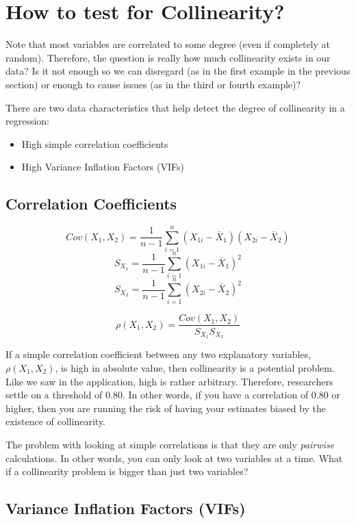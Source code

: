 \documentclass[
]{book}
\begin{document}
\hypertarget{how-to-test-for-collinearity}{%
\section{How to test for Collinearity?}\label{how-to-test-for-collinearity}}

Note that most variables are correlated to some degree (even if completely at random). Therefore, the question is really how much collinearity exists in our data? Is it not enough so we can disregard (as in the first example in the previous section) or enough to cause issues (as in the third or fourth example)?

There are two data characteristics that help detect the degree of collinearity in a regression:

\begin{itemize}
\item
  High simple correlation coefficients
\item
  High Variance Inflation Factors (VIFs)
\end{itemize}

\hypertarget{correlation-coefficients}{%
\subsection*{Correlation Coefficients}\label{correlation-coefficients}}

\[Cov(X_1,X_2)=\frac{1}{n-1} \sum_{i=1}^n (X_{1i}-\bar{X}_1)(X_{2i}-\bar{X}_2)\]
\[S_{X_1} = \frac{1}{n-1} \sum_{i=1}^n (X_{1i}-\bar{X}_1)^2\]
\[S_{X_2} = \frac{1}{n-1} \sum_{i=1}^n (X_{2i}-\bar{X}_2)^2\]

\[\rho(X_1,X_2) = \frac{Cov(X_1,X_2)}{S_{X_1}S_{X_2}}\]

If a simple correlation coefficient between any two explanatory variables, \(\rho(X_1,X_2)\), is high in absolute value, then collinearity is a potential problem. Like we saw in the application, high is rather arbitrary. Therefore, researchers settle on a threshold of 0.80. In other words, if you have a correlation of 0.80 or higher, then you are running the risk of having your estimates biased by the existence of collinearity.

The problem with looking at simple correlations is that they are only \emph{pairwise} calculations. In other words, you can only look at two variables at a time. What if a collinearity problem is bigger than just two variables?

\hypertarget{variance-inflation-factors-vifs}{%
\subsection*{Variance Inflation Factors (VIFs)}\label{variance-inflation-factors-vifs}}
\end{document}
